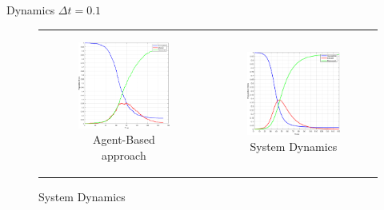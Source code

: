 \documentclass{beamer}
\begin{document}
\begin{frame}{Dynamics $\Delta t = 0.1$}
\begin{figure}
\begin{center}
	\begin{tabular}{c c}
		\begin{subfigure}[b]{0.4\textwidth}
			\centering
			\includegraphics[width=0.95\textwidth, angle=0]{./fig/SIR_Yampa_dt01.png}
			\caption*{Agent-Based approach}
		\end{subfigure}
    	
    	&
  
		\begin{subfigure}[b]{0.4\textwidth}
			\centering
			\includegraphics[width=1\textwidth, angle=0]{./fig/SIR_SD_001dt.png}
			\caption*{System Dynamics}
		\end{subfigure}
	\end{tabular}
\end{center}
\end{figure}
\end{frame}
\end{document}
